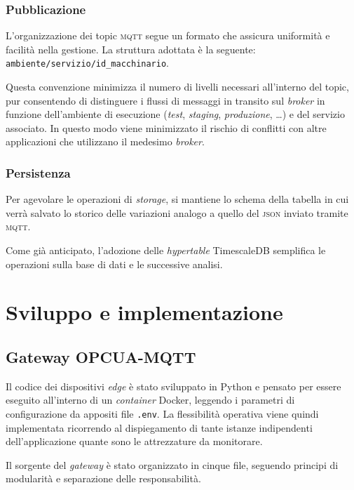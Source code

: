 \documentclass[12pt]{article}
\begin{document}
    \subsubsection{Pubblicazione}

    L’organizzazione dei topic \textsc{mqtt} segue un formato che assicura uniformità e facilità nella gestione. La struttura adottata è la seguente: \verb|ambiente/servizio/id_macchinario|.
    
    Questa convenzione minimizza il numero di livelli necessari all'interno del topic, pur consentendo di distinguere i flussi di messaggi in transito sul \textit{broker} in funzione dell'ambiente di esecuzione (\textit{test}, \textit{staging}, \textit{produzione}, \dots) e del servizio associato. In questo modo viene minimizzato il rischio di conflitti con altre applicazioni che utilizzano il medesimo \textit{broker}.

    \subsubsection{Persistenza}
    
    Per agevolare le operazioni di \textit{storage}, si mantiene lo schema della tabella in cui verrà salvato lo storico delle variazioni analogo a quello del \textsc{json} inviato tramite \textsc{mqtt}.

    Come già anticipato, l'adozione delle \textit{hypertable} TimescaleDB semplifica le operazioni sulla base di dati e le successive analisi.
    
    
    \section{Sviluppo e implementazione}
    \subsection{Gateway OPCUA-MQTT}
    Il codice dei dispositivi \textit{edge} è stato sviluppato in Python e pensato per essere eseguito all'interno di un \textit{container} Docker, leggendo i parametri di configurazione da appositi file \verb|.env|. La flessibilità operativa viene quindi implementata ricorrendo al dispiegamento di tante istanze indipendenti dell'applicazione quante sono le attrezzature da monitorare.

    Il sorgente del \textit{gateway} è stato organizzato in cinque file, seguendo principi di modularità e separazione delle responsabilità.
\end{document}
